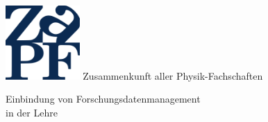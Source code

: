 \documentclass[DIV=calc]{scrartcl}
\begin{document}
\hspace{0.87\textwidth}
\begin{minipage}{120pt}
	\vspace{-1.8cm}
	\includegraphics[width=80pt]{../logo.pdf}
	\centering
	\small Zusammenkunft aller Physik-Fachschaften
\end{minipage}

\vspace{1cm}
\begin{center}
  \huge{Einbindung von Forschungsdatenmanagement\\in der Lehre}\vspace{.25\baselineskip}\\
  \normalsize
\end{center}
\vspace{1cm}





\end{document}
